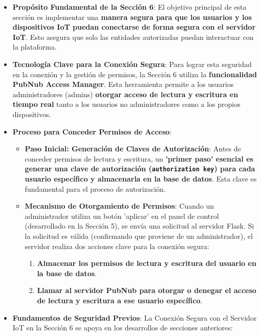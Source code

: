 \documentclass{report}
\begin{document}
\begin{itemize}
    \item \textbf{Propósito Fundamental de la Sección 6}: El objetivo principal de esta sección es implementar una \textbf{manera segura para que los 
    usuarios y los dispositivos IoT puedan conectarse de forma segura con el servidor IoT}. Esto asegura que solo las entidades autorizadas puedan 
    interactuar con la plataforma.
    \item \textbf{Tecnología Clave para la Conexión Segura}: Para lograr esta seguridad en la conexión y la gestión de permisos, la Sección 6 
    utiliza la \textbf{funcionalidad PubNub Access Manager}. Esta herramienta permite a los usuarios administradores (admins) \textbf{otorgar acceso de lectura y escritura en tiempo real} tanto a los usuarios no administradores como a los propios dispositivos.
    \item \textbf{Proceso para Conceder Permisos de Acceso}:
    \begin{itemize}
        \item \textbf{Paso Inicial: Generación de Claves de Autorización}: Antes de conceder permisos de lectura y escritura, un \textbf{ 'primer paso' 
        esencial es generar una clave de autorización (\texttt{authorization key}) para cada usuario específico y almacenarla en la base de datos}. 
        Esta clave es fundamental para el proceso de autorización.
        \item \textbf{Mecanismo de Otorgamiento de Permisos}: Cuando un administrador utiliza un botón  'aplicar' en el panel de control (desarrollado 
        en la Sección 5), se envía una solicitud al servidor Flask. Si la solicitud es válida (confirmando que proviene de un administrador), el servidor realiza dos acciones clave para la conexión segura:
        \begin{enumerate}
            \item \textbf{Almacenar los permisos de lectura y escritura del usuario en la base de datos}.
            \item \textbf{Llamar al servidor PubNub para otorgar o denegar el acceso de lectura y escritura a ese usuario específico}.
        \end{enumerate}
    \end{itemize}
    \item \textbf{Fundamentos de Seguridad Previos}: La Conexión Segura con el Servidor IoT en la Sección 6 se apoya en los desarrollos de secciones anteriores:
    \begin{itemize}

\end{itemize}
\end{itemize}
\end{document}
